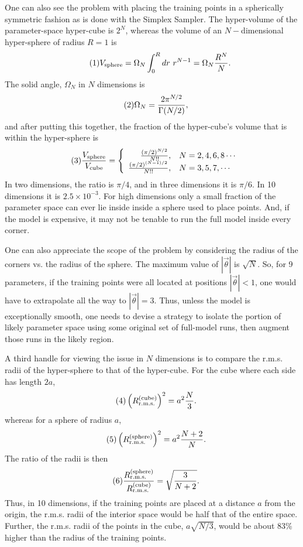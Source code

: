 \documentclass[12pt]{article}
\numberwithin{equation}{section}
\numberwithin{figure}{section}
\newcommand\eqnumber{\addtocounter{equation}{1}\tag{\theequation}}
\begin{document}
One can also see the problem with placing the training points in a spherically symmetric fashion as is done with the Simplex Sampler. The hyper-volume of the parameter-space hyper-cube is $2^N$, whereas the volume of an $N-$dimensional hyper-sphere of radius $R=1$ is 
\begin{align*}\eqnumber
V_{\rm sphere}=\Omega_N\int_0^R dr~r^{N-1}=\Omega_N\frac{R^N}{N}.
\end{align*}
The solid angle, $\Omega_N$ in $N$ dimensions is
\begin{align*}\eqnumber
\Omega_N&=\frac{2\pi^{N/2}}{\Gamma(N/2)},
\end{align*}
and after putting this together, the fraction of the hyper-cube's volume that is within the hyper-sphere is
\begin{align*}\eqnumber
\frac{V_{\rm sphere}}{V_{\rm cube}}&=\left\{\begin{array}{rl}
\frac{(\pi/2)^{N/2}}{N!!},&N=2,4,6,8\cdots\\
\frac{(\pi/2)^{(N-1)/2}}{N!!},&N=3,5,7,\cdots\end{array}\right.
\end{align*}
In two dimensions, the ratio is $\pi/4$, and in three dimensions it is $\pi/6$. In 10 dimensions it is $2.5\times 10^{-3}$. For high dimensions only a small fraction of the parameter space can ever lie inside inside a sphere used to place points. And, if the model is expensive, it may not be tenable to run the full model inside every corner. 

One can also appreciate the scope of the problem by considering the radius of the corners vs. the radius of  the sphere. The maximum value of $|\vec{\theta}|$ is $\sqrt{N}$. So, for 9 parameters, if the  training points were all located at positions $|\vec{\theta}|<1$, one would have to extrapolate all the way to $|\vec{\theta}|=3$. Thus, unless the model is exceptionally smooth, one needs to devise a strategy to isolate the portion of likely parameter space using some original set of full-model runs, then augment those runs in the likely region. 

A third handle for viewing the issue in $N$ dimensions is to compare the r.m.s. radii of the hyper-sphere to that of the hyper-cube. For the cube where each side has length $2a$,
\begin{align*}\eqnumber
\left(R_{\rm r.m.s.}^{\rm(cube)}\right)^2&=a^2\frac{N}{3}.
\end{align*}
whereas for a sphere of radius $a$,
\begin{align*}\eqnumber
\left(R_{\rm r.m.s.}^{\rm(sphere)}\right)^2&=a^2\frac{N+2}{N}.
\end{align*}
The ratio of the radii is then
\begin{align*}\eqnumber
\frac{R_{\rm r.m.s.}^{\rm(sphere)}}{R_{\rm r.m.s.}^{\rm(cube)}}&=\sqrt{\frac{3}{N+2}}.
\end{align*}
Thus, in 10 dimensions, if the training points are placed at a distance $a$ from the origin, the r.m.s. radii of the interior space would be half that of the entire space. Further, the r.m.s. radii of the points in the cube, $a\sqrt{N/3}$, would be about 83\% higher than the radius of the training points. 
\end{document}
